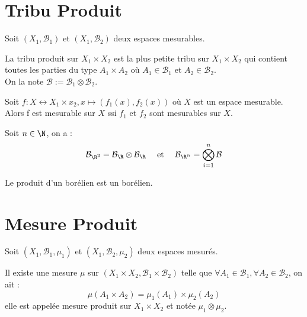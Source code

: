 \minitoc  %


\section{Tribu Produit}

Soit $(X_1,\mathcal{B}_1)$ et $(X_1,\mathcal{B}_2)$ deux espaces mesurables. 

\begin{definition}
    La tribu produit sur $X_1 \times X_2$ est la plus petite tribu sur $X_1 \times X_2$ qui contient toutes les 
    parties du type $A_1 \times A_2$ où $A_1 \in \mathcal{B}_1$ et $A_2 \in \mathcal{B}_2$. \\
    On la note $ \mathcal{B} := \mathcal{B}_1 \otimes \mathcal{B}_2$. 
\end{definition}

\begin{prop}
    Soit $f : X \longleftrightarrow X_1 \times x_2, x \longmapsto (f_1(x),f_2(x))$ où $X$ est un espace mesurable. \\
    Alors f est mesurable sur $X$ ssi $f_1$ et $f_2$ sont mesurables sur $X$. 
\end{prop}

\begin{theorem}
    Soit $n \in \N$, on a :
    \[ \mathcal{B}_{\R^2} = \mathcal{B}_\R \otimes \mathcal{B}_\R \quad \text{ et } \quad \mathcal{B}_{\R^n} = \bigotimes_{i=1}^n \mathcal{B} \] 
\end{theorem}

\begin{corollary}
    Le produit d'un borélien est un borélien. 
\end{corollary}

\section{Mesure Produit}

Soit $(X_1,\mathcal{B}_1,\mu_1)$ et $(X_1,\mathcal{B}_2,\mu_2)$ deux espaces mesurés. 

\begin{definition}
    Il existe une mesure $\mu$ sur $(X_1 \times X_2, \mathcal{B}_1 \times \mathcal{B}_2)$ telle que 
    $ \forall A_1 \in \mathcal{B}_1, \forall A_2 \in \mathcal{B}_2$, on ait :
        \[ \mu (A_1 \times A_2) = \mu_1(A_1) \times \mu_2(A_2) \]
    elle est appelée mesure produit sur $X_1 \times X_2$ et notée $\mu_1 \otimes \mu_2$. 
\end{definition}

